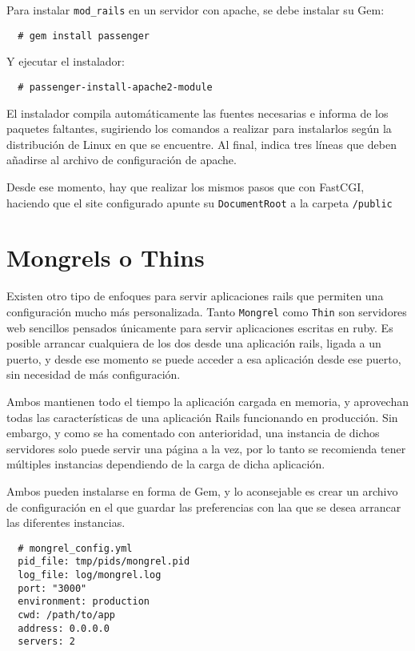 Para instalar \texttt{mod\_rails} en un servidor con apache, se debe instalar su Gem:

\begin{verbatim}
  # gem install passenger
\end{verbatim}

Y ejecutar el instalador:

\begin{verbatim}
  # passenger-install-apache2-module
\end{verbatim}

El instalador compila automáticamente las fuentes necesarias e informa de los paquetes faltantes, sugiriendo los comandos a realizar para instalarlos según la distribución de Linux en que se encuentre. Al final, indica tres líneas que deben añadirse al archivo de configuración de apache.

Desde ese momento, hay que realizar los mismos pasos que con FastCGI, haciendo que el site configurado apunte su \texttt{DocumentRoot} a la carpeta \texttt{/public}


\section{Mongrels o Thins} %
\label{sub:mongrels_thins}

Existen otro tipo de enfoques para servir aplicaciones rails que permiten una configuración mucho más personalizada. Tanto \texttt{Mongrel} como \texttt{Thin} son servidores web sencillos pensados únicamente para servir aplicaciones escritas en ruby. Es posible arrancar cualquiera de los dos desde una aplicación rails, ligada a un puerto, y desde ese momento se puede acceder a esa aplicación desde ese puerto, sin necesidad de más configuración.

Ambos mantienen todo el tiempo la aplicación cargada en memoria, y aprovechan todas las características de una aplicación Rails funcionando en producción. Sin embargo, y como se ha comentado con anterioridad, una instancia de dichos servidores solo puede servir una página a la vez, por lo tanto se recomienda tener múltiples instancias dependiendo de la carga de dicha aplicación.

Ambos pueden instalarse en forma de Gem, y lo aconsejable es crear un archivo de configuración en el que guardar las preferencias con laa que se desea arrancar las diferentes instancias.

\begin{verbatim}
  # mongrel_config.yml
  pid_file: tmp/pids/mongrel.pid
  log_file: log/mongrel.log
  port: "3000"
  environment: production
  cwd: /path/to/app
  address: 0.0.0.0
  servers: 2
\end{verbatim}

